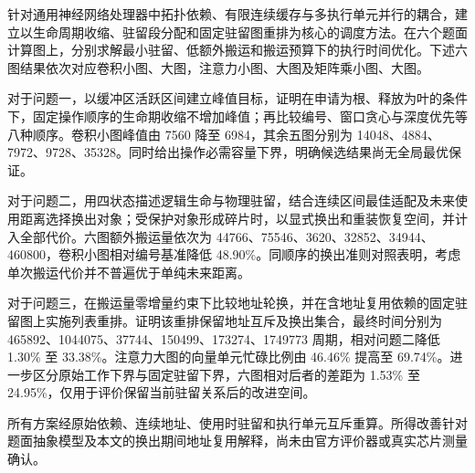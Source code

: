 针对通用神经网络处理器中拓扑依赖、有限连续缓存与多执行单元并行的耦合，建立以生命周期收缩、驻留段分配和固定驻留图重排为核心的调度方法。在六个题面计算图上，分别求解最小驻留、低额外搬运和搬运预算下的执行时间优化。下述六图结果依次对应卷积小图、大图，注意力小图、大图及矩阵乘小图、大图。

对于问题一，以缓冲区活跃区间建立峰值目标，证明在申请为根、释放为叶的条件下，固定操作顺序的生命期收缩不增加峰值；再比较编号、窗口贪心与深度优先等八种顺序。卷积小图峰值由 7560 降至 6984，其余五图分别为 14048、4884、7972、9728、35328。同时给出操作必需容量下界，明确候选结果尚无全局最优保证。

对于问题二，用四状态描述逻辑生命与物理驻留，结合连续区间最佳适配及未来使用距离选择换出对象；受保护对象形成碎片时，以显式换出和重装恢复空间，并计入全部代价。六图额外搬运量依次为 44766、75546、3620、32852、34944、460800，卷积小图相对编号基准降低 48.90\%。同顺序的换出准则对照表明，考虑单次搬运代价并不普遍优于单纯未来距离。

对于问题三，在搬运量零增量约束下比较地址轮换，并在含地址复用依赖的固定驻留图上实施列表重排。证明该重排保留地址互斥及换出集合，最终时间分别为 465892、1044075、37744、150499、173274、1749773 周期，相对问题二降低 1.30\% 至 33.38\%。注意力大图的向量单元忙碌比例由 46.46\% 提高至 69.74\%。进一步区分原始工作下界与固定驻留下界，六图相对后者的差距为 1.53\% 至 24.95\%，仅用于评价保留当前驻留关系后的改进空间。

所有方案经原始依赖、连续地址、使用时驻留和执行单元互斥重算。所得改善针对题面抽象模型及本文的换出期间地址复用解释，尚未由官方评价器或真实芯片测量确认。
